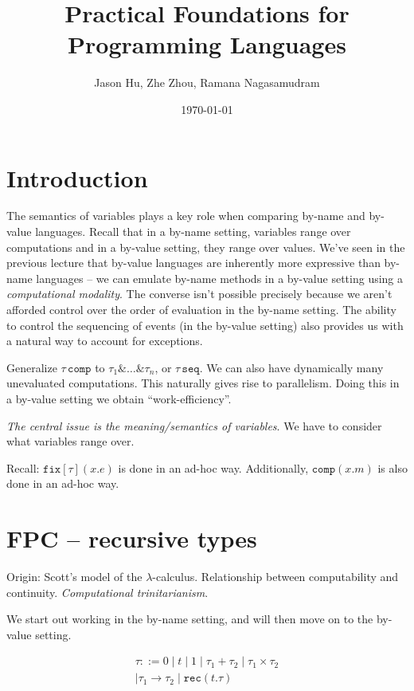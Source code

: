 \documentclass[11pt]{article}
\title{Practical Foundations for Programming Languages}
\author{Jason Hu, Zhe Zhou, Ramana Nagasamudram}
\date{\today{}}
\newcommand{\T}[1]{\ensuremath{\mathtt{#1}}}
\newcommand{\Lcomp}[1]{\ensuremath{#1\,\mathtt{comp}}}
\begin{document}
\maketitle

\section{Introduction}
\label{sec:intro}

The semantics of variables plays a key role when comparing by-name and
by-value languages. Recall that in a by-name setting, variables range over
computations and in a by-value setting, they range over values.  We've seen
in the previous lecture that by-value languages are inherently more
expressive than by-name languages -- we can emulate by-name methods in a
by-value setting using a \emph{computational modality}. The converse isn't 
possible precisely because we aren't afforded control over the order of 
evaluation in the by-name setting. The ability to control the sequencing of
events (in the by-value setting) also provides us with a natural way to
account for exceptions.


Generalize $\Lcomp{\tau}$ to $\tau_{1}\&\dots\&\tau_{n}$, or
$\tau\,\T{seq}$.  We can also have dynamically many unevaluated
computations.  This naturally gives rise to parallelism.  Doing this in a
by-value setting we obtain ``work-efficiency''.

\textit{The central issue is the meaning/semantics of variables}.  We have
to consider what variables range over.

Recall: $\T{fix}[\tau](x.e)$ is done in an ad-hoc way.  Additionally,
$\T{comp}(x.m)$ is also done in an ad-hoc way.

\section{FPC -- recursive types}
\label{sec:fpc}

Origin: Scott's model of the $\lambda$-calculus.  Relationship between
computability and continuity. \textit{Computational trinitarianism}.

We start out working in the by-name setting, and will then move on to the
by-value setting.

\begin{align*}
  \tau ::= 0 \mid t \mid 1 \mid\tau_{1}+\tau_{2}  \mid \tau_{1}\times\tau_{2} \\
   \mid \tau_{1}\rightarrow\tau_{2} \mid \T{rec}(t.\tau)
\end{align*}
\end{document}
